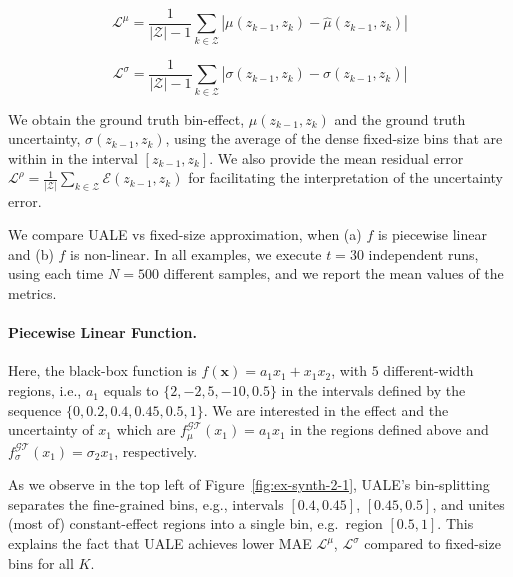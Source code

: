\documentclass[twoside]{article}
\begin{document}
\begin{equation}
  \label{eq:eval_met_1}
  \mathcal{L}^{\mu} = \frac{1}{|\mathcal{Z}| - 1} \sum_{k \in
  \mathcal{Z}} | \mu(z_{k-1}, z_k) - \hat{\mu}(z_{k-1}, z_k) |
\end{equation}


\begin{equation}
  \label{eq:eval_met_2}
  \mathcal{L}^{\sigma} = \frac{1}{|\mathcal{Z}| -1} \sum_{k \in
    \mathcal{Z}} | \sigma(z_{k-1}, z_k) - \hat{\sigma}(z_{k-1}, z_k) |
\end{equation}

We obtain the ground truth bin-effect, \(\mu(z_{k-1}, z_k)\) and the
ground truth uncertainty, \(\sigma(z_{k-1}, z_k)\), using the average
of the dense fixed-size bins that are within in the interval
\([z_{k-1}, z_k]\). We also provide the mean residual error
\(\mathcal{L}^{\rho} = \frac{1}{|\mathcal{Z}|} \sum_{k \in
  \mathcal{Z}} \mathcal{E}(z_{k-1}, z_k) \) for facilitating the
interpretation of the uncertainty error.


We compare UALE vs fixed-size approximation, when (a) \(f\) is
piecewise linear and (b) \(f\) is non-linear. In all examples, we
execute \(t = 30\) independent runs, using each time \(N=500\)
different samples, and we report the mean values of the metrics.

\paragraph{Piecewise Linear Function.}

Here, the black-box function is \(f(\mathbf{x}) = a_1x_1 + x_1x_2\),
with \(5\) different-width regions, i.e., \(a_1\) equals to
\(\{2, -2, 5, -10, 0.5\}\) in the intervals defined by the sequence
\(\{0, 0.2, 0.4, 0.45, 0.5, 1\}\). We are interested in the effect and
the uncertainty of \(x_1\) which are
\(f^{\mathcal{GT}}_{\mu}(x_1) = a_1x_1\) in the regions defined above
and \(f^{\mathcal{GT}}_{\sigma}(x_1) = \sigma_2 x_1\), respectively.

As we observe in the top left of Figure~\ref{fig:ex-synth-2-1}, UALE's
bin-splitting separates the fine-grained bins, e.g., intervals
\([0.4, 0.45]\), \([0.45, 0.5]\), and unites (most of) constant-effect
regions into a single bin, e.g.~region \([0.5, 1]\). This explains the
fact that UALE achieves lower MAE \(\mathcal{L}^{\mu}\),
\(\mathcal{L}^{\sigma}\) compared to fixed-size bins for all \(K\).
\end{document}
